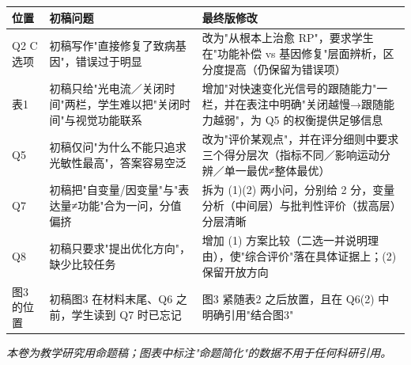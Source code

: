 \documentclass[UTF8,a4paper,11pt]{ctexart}
\begin{document}
\begin{longtable}{@{}p{1.6cm}p{5.4cm}p{6.6cm}@{}}
\toprule
\textbf{位置} & \textbf{初稿问题} & \textbf{最终版修改} \\
\midrule
\endhead
Q2 C 选项 & 初稿写作"直接修复了致病基因"，错误过于明显 & 改为"从根本上治愈 RP"，要求学生在"功能补偿 vs 基因修复"层面辨析，区分度提高（仍保留为错误项） \\
表1 & 初稿只给"光电流／关闭时间"两栏，学生难以把"关闭时间"与视觉功能联系 & 增加"对快速变化光信号的跟随能力"一栏，并在表注中明确"关闭越慢→跟随能力越弱"，为 Q5 的权衡提供足够信息 \\
Q5 & 初稿仅问"为什么不能只追求光敏性最高"，答案容易空泛 & 改为"评价某观点"，并在评分细则中要求三个得分层次（指标不同／影响运动分辨／单一最优≠整体最优） \\
Q7 & 初稿把"自变量/因变量"与"表达量≠功能"合为一问，分值偏挤 & 拆为 (1)(2) 两小问，分别给 2 分，变量分析（中间层）与批判性评价（拔高层）分层清晰 \\
Q8 & 初稿只要求"提出优化方向"，缺少比较任务 & 增加 (1) 方案比较（二选一并说明理由），使"综合评价"落在具体证据上；(2) 保留开放方向 \\
图3 的位置 & 初稿图3 在材料末尾、Q6 之前，学生读到 Q7 时已忘记 & 图3 紧随表2 之后放置，且在 Q6(2) 中明确引用"结合图3" \\
\bottomrule
\end{longtable}

\vfill
\begin{center}
\small\itshape 本卷为教学研究用命题稿；图表中标注"命题简化"的数据不用于任何科研引用。
\end{center}
\end{document}

